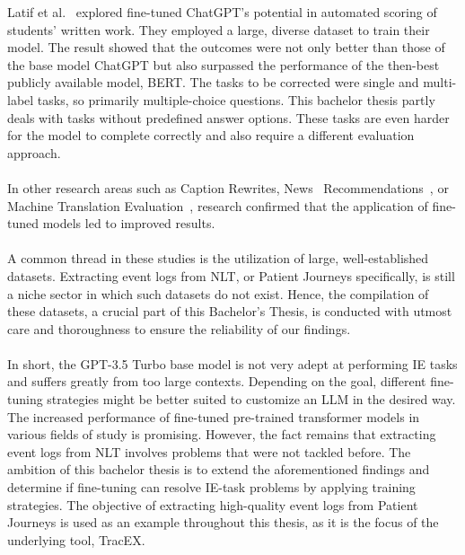 \newpage
Latif et al.~\cite{latif_fine-tuning_2024} explored fine-tuned ChatGPT's potential in automated scoring of students' written work. They employed a large, diverse dataset to train their model. The result showed that the outcomes were not only better than those of the base model ChatGPT but also surpassed the performance of the then-best publicly available model, BERT. The tasks to be corrected were single and multi-label tasks, so primarily multiple-choice questions. This bachelor thesis partly deals with tasks without predefined answer options. These tasks are even harder for the model to complete correctly and also require a different evaluation approach.\\\\
In other research areas such as Caption Rewrites, News~\cite{gladkoff_predictive_2023} Recommendations~\cite{li_exploring_2023}, or Machine Translation Evaluation~\cite{wang_mitigating_2023}, research confirmed that the application of fine-tuned models led to improved results.\\\\
A common thread in these studies is the utilization of large, well-established datasets. Extracting event logs from NLT, or Patient Journeys specifically, is still a niche sector in which such datasets do not exist. Hence, the compilation of these datasets, a crucial part of this Bachelor's Thesis, is conducted with utmost care and thoroughness to ensure the reliability of our findings.\\\\
In short, the GPT-3.5 Turbo base model is not very adept at performing IE tasks and suffers greatly from too large contexts. Depending on the goal, different fine-tuning strategies might be better suited to customize an LLM in the desired way. The increased performance of fine-tuned pre-trained transformer models in various fields of study is promising. However, the fact remains that extracting event logs from NLT involves problems that were not tackled before. The ambition of this bachelor thesis is to extend the aforementioned findings and determine if fine-tuning can resolve IE-task problems by applying training strategies. The objective of extracting high-quality event logs from Patient Journeys is used as an example throughout this thesis, as it is the focus of the underlying tool, TracEX.